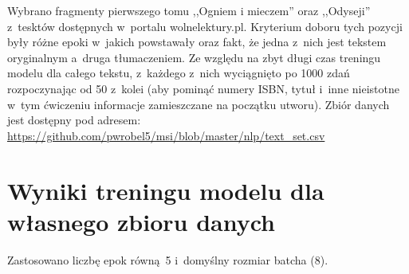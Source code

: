 \documentclass[12pt, a4paper]{mwart}
\begin{document}
Wybrano fragmenty pierwszego tomu ,,Ogniem i mieczem'' oraz ,,Odyseji'' z~tesktów dostępnych w~portalu wolnelektury.pl. Kryterium doboru tych pozycji były różne epoki w~jakich powstawały oraz fakt, że jedna z~nich jest tekstem oryginalnym a~druga tłumaczeniem. Ze względu na zbyt długi czas treningu modelu dla całego tekstu, z~każdego z~nich wyciągnięto po 1000 zdań rozpoczynając od 50 z~kolei (aby pominąć numery ISBN, tytuł i~inne nieistotne w~tym ćwiczeniu informacje zamieszczane na początku utworu). Zbiór danych jest dostępny pod adresem: \url{https://github.com/pwrobel5/msi/blob/master/nlp/text_set.csv}

\section{Wyniki treningu modelu dla własnego zbioru danych}

Zastosowano liczbę epok równą~5 i~domyślny rozmiar batcha (8).
\end{document}
